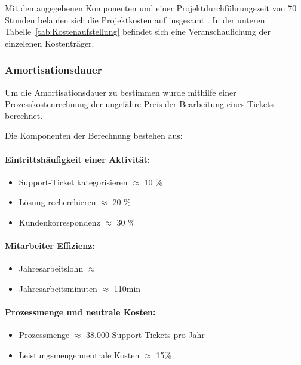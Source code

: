 Mit den angegebenen Komponenten und einer Projektdurchführungszeit von 70 Stunden
belaufen sich die Projektkosten auf insgesamt . In der unteren Tabelle~\ref{tab:Kostenaufstellung}
befindet sich eine Veranschaulichung der einzelenen Kostenträger.

\subsubsection{Amortisationsdauer}
\label{sec:Amortisationsdauer} 

Um die Amortisationsdauer zu bestimmen wurde mithilfe einer Prozesskostenrechnung
der ungefähre Preis der Bearbeitung eines Tickets berechnet. 

Die Komponenten der Berechnung bestehen aus:

\paragraph {Eintrittshäufigkeit einer Aktivität:} 
\begin{itemize}
	\item Support-Ticket kategorisieren $  \approx  $ 10 \%  
	\item Lösung recherchieren $  \approx  $ 20 \%
	\item Kundenkorrespondenz $  \approx  $ 30 \%         	
\end{itemize}

\paragraph{Mitarbeiter Effizienz:} 
\begin{itemize}
	\item Jahresarbeitslohn  $  \approx  $  
	\item Jahresarbeitsminuten  $  \approx  $ 110min   	
\end{itemize}

\paragraph{Prozessmenge und neutrale Kosten:} 
\begin{itemize}
	\item Prozessmenge  $  \approx  $  38.000 Support-Tickets pro Jahr   
	\item Leistungsmengenneutrale Kosten  $  \approx  $ 15\% 	
\end{itemize}

